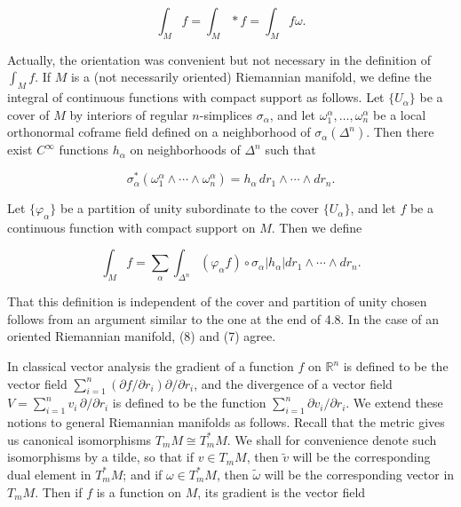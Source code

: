 \begin{equation}
\tag{7}\label{eq:4.10:7}
\int_{M}f=\int_{M}*f=\int_{M}f\omega.
\end{equation}

Actually, the orientation was convenient but not necessary in the definition of $\int_{M} f$. If $M$ is a (not necessarily oriented) Riemannian manifold, we define the integral of continuous functions with compact support as follows. Let $\{U_\alpha\}$ be a cover of $M$ by interiors of regular $n$-simplices $\sigma_\alpha$, and let $\omega_1^\alpha, \ldots, \omega_n^\alpha$ be a local orthonormal coframe field defined on a neighborhood of $\sigma_\alpha(\Delta^n)$. Then there exist $C^\infty$ functions $h_\alpha$ on neighborhoods of $\Delta^n$ such that

\[
\sigma_{\alpha}^{*}(\omega_{1}^{\alpha}\wedge\cdots\wedge\omega_{n}^{\alpha})=h_{\alpha}\,dr_{1}\wedge\cdots\wedge dr_{n}.
\]

Let $\{\varphi_{\alpha}\}$ be a partition of unity subordinate to the cover $\{U_{\alpha}\}$, and let $f$ be a continuous function with compact support on $M$. Then we define

\begin{equation}
\tag{8}\label{eq:4.10:8}
\int_{M}f=\sum_{\alpha}\int_{\Delta^{n}}(\varphi_{\alpha}f)\circ\sigma_{\alpha}\left|h_{\alpha}\right|d r_{1}\wedge\cdots\wedge d r_{n}.
\end{equation}

That this definition is independent of the cover and partition of unity chosen follows from an argument similar to the one at the end of 4.8. In the case of an oriented Riemannian manifold, (8) and (7) agree.

In classical vector analysis the gradient of a function $f$ on $\mathbb{R}^n$ is defined to be the vector field $\sum_{i=1}^{n}(\partial f/\partial r_i)\partial/\partial r_i$, and the divergence of a vector field $V=\sum_{i=1}^{n}v_i\,\partial/\partial r_i$ is defined to be the function $\sum_{i=1}^{n}\partial v_i/\partial r_i$. We extend these notions to general Riemannian manifolds as follows. Recall that the metric gives us canonical isomorphisms $T_{m} M\cong T_{m}^{*} M$. We shall for convenience denote such isomorphisms by a tilde, so that if $v\in T_{m} M$, then $\tilde{v}$ will be the corresponding dual element in $T_{m}^{*} M$; and if $\omega\in T_{m}^{*} M$, then $\tilde{\omega}$ will be the corresponding vector in $T_{m} M$. Then if $f$ is a function on $M$, its gradient is the vector field 

